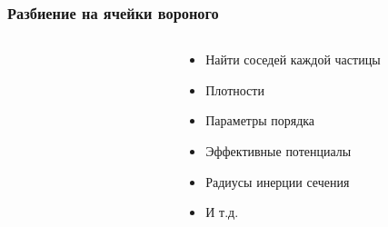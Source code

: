 \documentclass[pdf,hyperref={unicode}]{beamer}
\begin{document}
\begin{frame}%
\transdissolve[duration=0.2]
\frametitle{Разбиение на ячейки вороного}

\begin{columns}

\begin{column}{0.47\linewidth}
\begin{figure}[h]


\end{figure}
\end{column}

\pause \begin{column}{0.47\linewidth}
\begin{itemize}
\item Найти соседей каждой частицы
\item Плотности
\item Параметры порядка
\item Эффективные потенциалы
\item Радиусы инерции сечения
\item И т.д.
\end{itemize}
\end{column}


\end{columns}
\end{frame}
\end{document}
